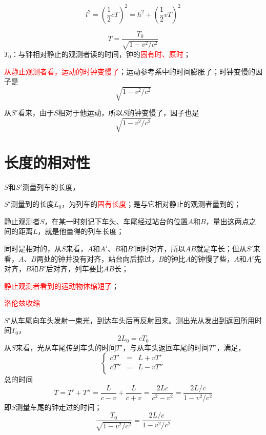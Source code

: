 \documentclass[12pt,a4paper]{article}
\begin{document}
\begin{equation}
l^2 =  \left(\frac{1}{2}cT\right)^2 =  h^2 + \left( \frac{1}{2}vT\right)^2 
\end{equation}

\begin{equation}
T = \frac{T_0}{\sqrt{1-v^2/c^2}}
\end{equation}
$T_0$：与钟相对静止的观测者读的时间，钟的\textcolor{red}{固有时、原时}；

\textcolor{red}{从静止观测者看，运动的时钟变慢了}；运动参考系中的时间膨胀了；时钟变慢的因子是
\begin{equation}
\sqrt{1-v^2/c^2}
\end{equation}

从$S'$看来，由于$S$相对于他运动，所以$S$的钟变慢了，因子也是
\begin{equation}
\sqrt{1-v^2/c^2}
\end{equation}

\section{长度的相对性}
$S$和$S'$测量列车的长度，

$S'$测量到的长度$L_0$，为列车的\textcolor{red}{固有长度}；是与它相对静止的观测者量到的；

静止观测者$S$，在某一时刻记下车头、车尾经过站台的位置$A$和$B$，量出这两点之间的距离$L$，就是他量得的列车长度；

同时是相对的，从$S$来看，$A$和$A'$、$B$和$B'$同时对齐，所以$AB$就是车长；但从$S'$来看，$A$、$B$两处的钟并没有对齐，站台向后掠过，$B$的钟比$A$的钟慢了些，$A$和$A'$先对齐，$B$和$B'$后对齐，列车要比$AB$长；

\textcolor{red}{静止观测者看到的运动物体缩短了}；

\textcolor{red}{洛伦兹收缩}

$S'$从车尾向车头发射一束光，到达车头后再反射回来。测出光从发出到返回所用时间$T_0$，
\begin{equation}
2L_0 = cT_0
\end{equation}
从$S$来看，光从车尾传到车头的时间$T'$，与从车头返回车尾的时间$T''$，满足，
\begin{equation}
\left\{
\begin{aligned}
cT' &=& L + vT' \\
cT'' &=& L -vT'' \\
\end{aligned} \right.
\end{equation}
总的时间
\begin{equation}
T = T' +T'' = \frac{L}{c-v} + \frac{L}{c+v} =  \frac{2Lc}{c^2-v^2} =  \frac{2L/c}{1-v^2/c^2}
\end{equation}
即$S$测量车尾的钟走过的时间；
\begin{equation}
 \frac{T_0}{\sqrt{1-v^2/c^2} } = \frac{2L/c}{1-v^2/c^2}
\end{equation}
\end{document}
